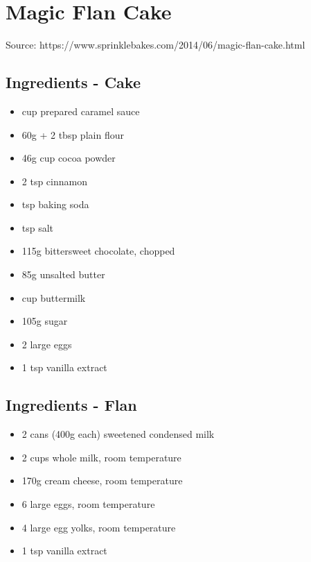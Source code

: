 \section{Magic Flan Cake}

  
Source: https://www.sprinklebakes.com/2014/06/magic-flan-cake.html

  \begin{multicols}{2}
    \subsection{Ingredients - Cake}
      \begin{itemize}
        \item {} cup prepared caramel sauce
        \item 60g + 2 tbsp plain flour
        \item 46g cup cocoa powder
        \item 2 tsp cinnamon
        \item {} tsp baking soda
        \item {} tsp salt
        \item 115g bittersweet chocolate, chopped
        \item 85g unsalted butter
        \item {} cup buttermilk
        \item 105g sugar
        \item 2 large eggs
        \item 1 tsp vanilla extract
      \end{itemize}
      \subsection{Ingredients - Flan}
        \begin{itemize}
          \item 2 cans (400g each) sweetened condensed milk
          \item 2 cups whole milk, room temperature
          \item 170g cream cheese, room temperature
          \item 6 large eggs, room temperature
          \item 4 large egg yolks, room temperature
          \item 1 tsp vanilla extract
        \end{itemize}
  \vfill\null
  \columnbreak

\end{multicols}
